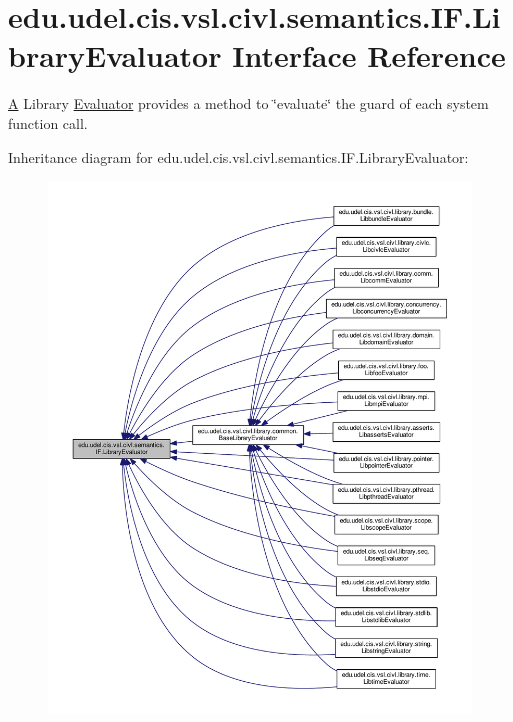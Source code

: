 \hypertarget{interfaceedu_1_1udel_1_1cis_1_1vsl_1_1civl_1_1semantics_1_1IF_1_1LibraryEvaluator}{}\section{edu.\+udel.\+cis.\+vsl.\+civl.\+semantics.\+I\+F.\+Library\+Evaluator Interface Reference}
\label{interfaceedu_1_1udel_1_1cis_1_1vsl_1_1civl_1_1semantics_1_1IF_1_1LibraryEvaluator}


\hyperlink{structA}{A} Library \hyperlink{interfaceedu_1_1udel_1_1cis_1_1vsl_1_1civl_1_1semantics_1_1IF_1_1Evaluator}{Evaluator} provides a method to \char`\"{}evaluate\char`\"{} the guard of each system function call.  




Inheritance diagram for edu.\+udel.\+cis.\+vsl.\+civl.\+semantics.\+I\+F.\+Library\+Evaluator\+:
\nopagebreak
\begin{figure}[H]
\begin{center}
\leavevmode
\includegraphics[width=350pt]{interfaceedu_1_1udel_1_1cis_1_1vsl_1_1civl_1_1semantics_1_1IF_1_1LibraryEvaluator__inherit__graph}
\end{center}
\end{figure}
